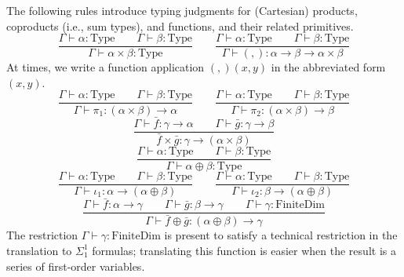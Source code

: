 \documentclass[11pt]{article}
\begin{document}
The following rules introduce typing judgments for (Cartesian) products,
coproducts (i.e., sum types), and functions, and their related primitives.
\begin{equation}
	\frac{\Gamma \vdash \alpha : \text{Type}
	\qquad \Gamma \vdash \beta : \text{Type}}
	{\Gamma \vdash \alpha \times \beta : \text{Type}}
	\qquad
	\frac{\Gamma \vdash \alpha : \text{Type}
	\qquad \Gamma \vdash \beta : \text{Type}}
	{\Gamma \vdash (,) : \alpha \to \beta \to \alpha \times \beta}
\end{equation}
At times, we write a function application $(,)(x, y)$
in the abbreviated form $(x,y)$.
\begin{equation}
	\frac{\Gamma \vdash \alpha : \text{Type}
	\qquad \Gamma \vdash \beta : \text{Type}}
	{\Gamma \vdash \pi_1 : (\alpha \times \beta) \to \alpha}
	\qquad
	\frac{\Gamma \vdash \alpha : \text{Type}
	\qquad \Gamma \vdash \beta : \text{Type}}
	{\Gamma \vdash \pi_2 : (\alpha \times \beta) \to \beta}
\end{equation}
\begin{equation}
	\frac{\Gamma \vdash \bar{f} : \gamma \to \alpha
	\qquad \Gamma \vdash \bar{g} : \gamma \to \beta}
	{\bar{f} \times \bar{g} : \gamma \to (\alpha \times \beta)}
\end{equation}
\begin{equation}
	\frac{\Gamma \vdash \alpha : \text{Type}
	\qquad \Gamma \vdash \beta : \text{Type}}
	{\Gamma \vdash \alpha \oplus \beta : \text{Type}}
\end{equation}
\begin{equation}
	\frac{\Gamma \vdash \alpha : \text{Type}
	\qquad \Gamma \vdash \beta : \text{Type}}
	{\Gamma \vdash \iota_1 : \alpha \to (\alpha \oplus \beta)}
	\qquad
	\frac{\Gamma \vdash \alpha : \text{Type}
	\qquad \Gamma \vdash \beta : \text{Type}}
	{\Gamma \vdash \iota_2 : \beta \to (\alpha \oplus \beta)}
\end{equation}
\begin{equation}
	\frac{\Gamma \vdash \bar{f} : \alpha \to \gamma
	\qquad \Gamma \vdash \bar{g} : \beta \to \gamma
	\qquad \Gamma \vdash \gamma : \text{FiniteDim}}
	{\Gamma \vdash \bar{f} \oplus \bar{g} : (\alpha \oplus \beta) \to \gamma}
\end{equation}
The restriction $\Gamma \vdash \gamma : \text{FiniteDim}$ is present to
satisfy a technical restriction in the translation to $\Sigma^1_1$ formulas;
translating this function is easier when the result is a series
of first-order variables.
\end{document}
